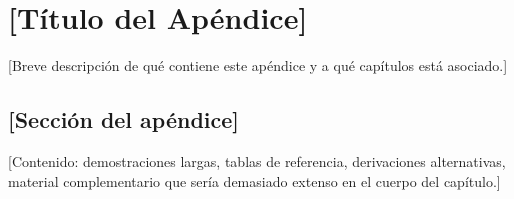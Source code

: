 
\chapter{[Título del Apéndice]}
\label{ap:[etiqueta]}

[Breve descripción de qué contiene este apéndice y a qué capítulos está asociado.]

\section{[Sección del apéndice]}
\label{sec:ap[etiqueta]-1}

[Contenido: demostraciones largas, tablas de referencia, derivaciones
alternativas, material complementario que sería demasiado extenso en el
cuerpo del capítulo.]

